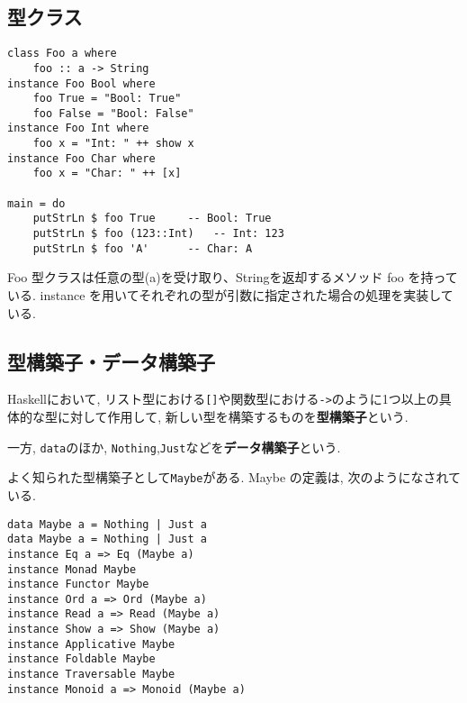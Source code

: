 \subsection{型クラス}
\begin{lstlisting}
class Foo a where
    foo :: a -> String
instance Foo Bool where
    foo True = "Bool: True"
    foo False = "Bool: False"
instance Foo Int where
    foo x = "Int: " ++ show x
instance Foo Char where
    foo x = "Char: " ++ [x]

main = do
    putStrLn $ foo True		-- Bool: True
    putStrLn $ foo (123::Int)	-- Int: 123
    putStrLn $ foo 'A'		-- Char: A
\end{lstlisting}
Foo 型クラスは任意の型(a)を受け取り、Stringを返却するメソッド foo を持っている. instance を用いてそれぞれの型が引数に指定された場合の処理を実装している.
\subsection{型構築子・データ構築子}
Haskellにおいて, リスト型における\verb|[]|や関数型における\verb|->|のように1つ以上の具体的な型に対して作用して, 新しい型を構築するものを{\bf 型構築子}という.

一方, \verb|data|のほか, \verb|Nothing|,\verb|Just|などを{\bf データ構築子}という.

よく知られた型構築子として\verb|Maybe|がある. Maybe の定義は, 次のようになされている.
\begin{lstlisting}
data Maybe a = Nothing | Just a
data Maybe a = Nothing | Just a         
instance Eq a => Eq (Maybe a) 
instance Monad Maybe 
instance Functor Maybe 
instance Ord a => Ord (Maybe a) 
instance Read a => Read (Maybe a) 
instance Show a => Show (Maybe a) 
instance Applicative Maybe 
instance Foldable Maybe 
instance Traversable Maybe 
instance Monoid a => Monoid (Maybe a) 
\end{lstlisting}
